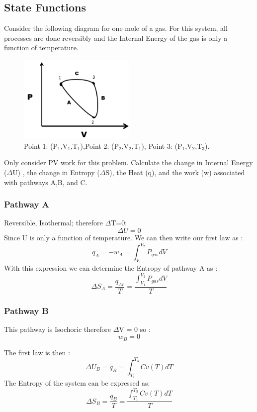 \documentclass{article}
\newcommand{\be}{\begin{equation}}
\newcommand{\ee}{\end{equation}}
\begin{document}
\subsection{State Functions}

Consider the following diagram for one mole of a gas. 
For this system, all processes are done reversibly and the Internal Energy of the gas is only a function of temperature.


\begin{figure}[h]
\centering
\caption{Point 1: (P$_1$,V$_1$,T$_1$),\quad Point 2: (P$_2$,V$_2$,T$_1$), \quad Point 3: (P$_1$,V$_2$,T$_3$).}
\includegraphics[width=0.5\textwidth]{midterm3.png}
\end{figure}

Only consider PV work for this problem. 
Calculate the change in Internal Energy ($\Delta$U) , the change in Entropy ($\Delta$S), the Heat (q), and the work (w) associated with pathways A,B, and C. 

\bigskip

\subsubsection*{Pathway A} 
Reversible, Isothermal; therefore $\Delta$T=0: 
\be
\Delta U = 0 
\ee
Since U is only a function of temperature. We can then write our first law as : 
\be
q_A=- w_A=\int_{V_1}^{V_2} P_{gas} dV
\ee
With this expression we can determine the Entropy of pathway A as : 
\be
\Delta S_A = \frac{q_{Ar}}{T} = \frac{\int_{V_1}^{V_2} P_{gas} dV}{T}
\ee

\subsubsection*{Pathway B}
This pathway is Isochoric therefore $\Delta$V = 0 so :
\be
w_B = 0 
\ee

The first law is then : 
\be
\Delta U_B = q_B = \int_{T_1}^{T_3} Cv(T) dT
\ee
The Entropy of the system can be expressed as: 
\be
\Delta S_B = \frac{q_B}{T} = \frac{\int_{T_1}^{T_3} Cv(T) dT}{T}
\ee
\end{document}
